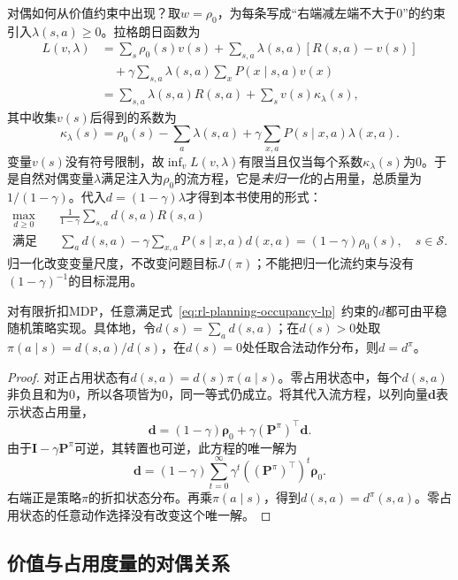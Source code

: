 对偶如何从价值约束中出现？取$w=\rho_0$，为每条写成“右端减左端不大于0”的约束引入$\lambda(s,a)\geq0$。拉格朗日函数为
\[
 \begin{aligned}
 L(v,\lambda)
 &=\sum_s\rho_0(s)v(s)
 +\sum_{s,a}\lambda(s,a)[R(s,a)-v(s)]\\
 &\quad+\gamma\sum_{s,a}\lambda(s,a)\sum_xP(x\mid s,a)v(x)\\
 &=\sum_{s,a}\lambda(s,a)R(s,a)+\sum_s v(s)\kappa_\lambda(s),
 \end{aligned}
 \]
其中收集$v(s)$后得到的系数为
\[
 \kappa_\lambda(s)=\rho_0(s)-\sum_a\lambda(s,a)
       +\gamma\sum_{x,a}P(s\mid x,a)\lambda(x,a).
\]
变量$v(s)$没有符号限制，故$\inf_v L(v,\lambda)$有限当且仅当每个系数$\kappa_\lambda(s)$为0。于是自然对偶变量$\lambda$满足注入为$\rho_0$的流方程，它是\emph{未归一化}的占用量，总质量为$1/(1-\gamma)$。代入$d=(1-\gamma)\lambda$才得到本书使用的形式：
\begin{equation}
 \begin{aligned}
 \max_{d\geq0}\quad&
 \frac{1}{1-\gamma}\sum_{s,a}d(s,a)R(s,a)\\
 \text{满足}\quad&
 \sum_a d(s,a)-\gamma\sum_{x,a}P(s\mid x,a)d(x,a)
   =(1-\gamma)\rho_0(s),\quad s\in\mathcal S.
 \end{aligned}
 \label{eq:rl-planning-occupancy-lp}
\end{equation}
归一化改变变量尺度，不改变问题目标$J(\pi)$；不能把归一化流约束与没有$(1-\gamma)^{-1}$的目标混用。

\begin{theorem}[可行占用量的策略实现]
 \label{thm:rl-planning-occupancy-realization}
 对有限折扣MDP，任意满足式~\eqref{eq:rl-planning-occupancy-lp}~约束的$d$都可由平稳随机策略实现。具体地，令$d(s)=\sum_a d(s,a)$；在$d(s)>0$处取$\pi(a\mid s)=d(s,a)/d(s)$，在$d(s)=0$处任取合法动作分布，则$d=d^\pi$。
\end{theorem}
\begin{proof}
 对正占用状态有$d(s,a)=d(s)\pi(a\mid s)$。零占用状态中，每个$d(s,a)$非负且和为0，所以各项皆为0，同一等式仍成立。将其代入流方程，以列向量$\bm d$表示状态占用量，
 \[
 \bm d=(1-\gamma)\bm\rho_0+\gamma(\bm P^\pi)^\top\bm d.
 \]
 由于$\bm I-\gamma\bm P^\pi$可逆，其转置也可逆，此方程的唯一解为
 \[
 \bm d=(1-\gamma)\sum_{t=0}^{\infty}
 \gamma^t((\bm P^\pi)^\top)^t\bm\rho_0.
 \]
 右端正是策略$\pi$的折扣状态分布。再乘$\pi(a\mid s)$，得到$d(s,a)=d^\pi(s,a)$。零占用状态的任意动作选择没有改变这个唯一解。
\end{proof}

\subsection{价值与占用度量的对偶关系}
\label{sec:rl-planning-duality}

